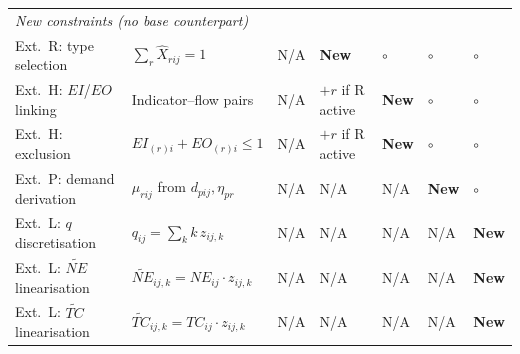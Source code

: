 \begin{longtable}{lp{1.6cm}p{2.1cm}p{2.1cm}p{1.6cm}p{1.6cm}p{2.2cm}}
\midrule
\multicolumn{7}{l}{\textit{New constraints (no base counterpart)}} \\[4pt]

Ext.~R: type selection
  & $\sum_{r}\hat{X}_{rij}=1$
  & N/A & \textbf{New} & $\circ$ & $\circ$ & $\circ$ \\[4pt]

Ext.~H: $EI$/$EO$ linking
  & Indicator–flow pairs
  & N/A & $+r$ if R active & \textbf{New} & $\circ$ & $\circ$ \\[4pt]

Ext.~H: exclusion
  & $EI_{(r)i}+EO_{(r)i}\leq 1$
  & N/A & $+r$ if R active & \textbf{New} & $\circ$ & $\circ$ \\[4pt]

Ext.~P: demand derivation
  & $\mu_{rij}$ from $d_{pij},\eta_{pr}$
  & N/A & N/A & N/A & \textbf{New} & $\circ$ \\[4pt]

Ext.~L: $q$ discretisation
  & $q_{ij}=\sum_k k\,z_{ij,k}$
  & N/A & N/A & N/A & N/A & \textbf{New} \\[4pt]

Ext.~L: $\widetilde{NE}$ linearisation
  & $\widetilde{NE}_{ij,k}=NE_{ij}\cdot z_{ij,k}$
  & N/A & N/A & N/A & N/A & \textbf{New} \\[4pt]

Ext.~L: $\widetilde{TC}$ linearisation
  & $\widetilde{TC}_{ij,k}=TC_{ij}\cdot z_{ij,k}$
  & N/A & N/A & N/A & N/A & \textbf{New} \\

\end{longtable}
